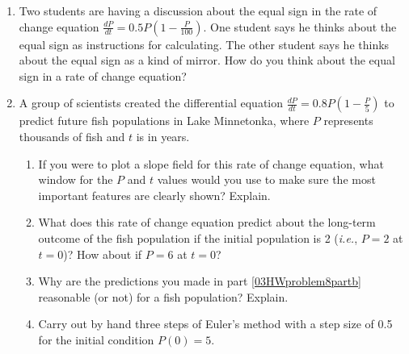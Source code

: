 \begin{enumerate}

\item	Two students are having a discussion about the equal sign in the rate of change equation $\displaystyle\frac{dP}{dt} = 0.5P\left(1 - \frac{P}{100}\right)$. One student says he thinks about the equal sign as instructions for calculating. The other student says he thinks about the equal sign as a kind of mirror. How do you think about the equal sign in a rate of change equation? \label{03HWproblem7}

\clearpage

\item A group of scientists created the differential equation $\displaystyle\frac{dP}{dt}=0.8P\left(1-\frac{P}{5}\right)$  to predict future fish populations in Lake Minnetonka, where $P$ represents thousands of fish and $t$ is in years. \label{03HWproblem8}

\begin{enumerate}
\item	If you were to plot a slope field for this rate of change equation, what window for the $P$ and $t$ values would you use to make sure the most important features are clearly shown? Explain. \label{03HWproblem8parta}
\item	What does this rate of change equation predict about the long-term outcome of the fish population if the initial population is 2 ({\em i.e.}, $P = 2$ at $t = 0$)? How about if $P = 6$ at $t = 0$? \label{03HWproblem8partb}
\item	Why are the predictions you made in part \ref{03HWproblem8partb} reasonable (or not) for a fish population? Explain. \label{03HWproblem8partc}
\item	Carry out by hand three steps of Euler's method with a step size of 0.5 for the initial condition $P(0) = 5$. \label{03HWproblem8partd}
\end{enumerate}

\end{enumerate}
